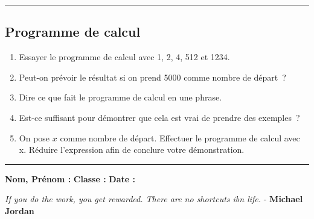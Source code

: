 \documentclass[11pt]{article}
\newcommand{\horrule}[1]{\rule{\linewidth}{#1}} %
\begin{document}
\vspace{-0.4cm}
\horrule{1px}
\vspace{-0.8cm}

\subsection*{Programme de calcul}

\begin{enumerate}
  \item Essayer le programme de calcul avec 1, 2, 4, 512 et 1234.
  \item Peut-on prévoir le résultat si on prend 5000 comme nombre de départ ?
  \item Dire ce que fait le programme de calcul en une phrase.
  \item Est-ce suffisant pour démontrer que cela est vrai de prendre des exemples ?
  \item On pose $x$ comme nombre de départ. Effectuer le programme de calcul avec x. Réduire l’expression afin de conclure votre démonstration.
\end{enumerate}

\vspace{1cm}
\horrule{1px}
\vspace{1cm}

\textbf{Nom, Prénom :} \hspace{8cm} \textbf{Classe :} \hspace{3cm} \textbf{Date :}\\
\vspace{-0.8cm}
\begin{center}
  \textit{If you do the work, you get rewarded. There are no shortcuts ibn life.}  - \textbf{Michael Jordan}
\end{center}
\vspace{-0.8cm}
\end{document}
